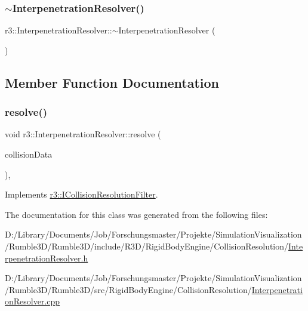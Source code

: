 \subsubsection{\texorpdfstring{$\sim$\+Interpenetration\+Resolver()}{~InterpenetrationResolver()}}
{\footnotesize\ttfamily r3\+::\+Interpenetration\+Resolver\+::$\sim$\+Interpenetration\+Resolver (\begin{DoxyParamCaption}{ }\end{DoxyParamCaption})\hspace{0.3cm}{\ttfamily [default]}}



\subsection{Member Function Documentation}
\mbox{\label{classr3_1_1_interpenetration_resolver_a7a5dfd8678e5b056ec0978e857cca0ef}} 
\subsubsection{\texorpdfstring{resolve()}{resolve()}}
{\footnotesize\ttfamily void r3\+::\+Interpenetration\+Resolver\+::resolve (\begin{DoxyParamCaption}\item[{const \mbox{\hyperlink{classr3_1_1_collision_data}{Collision\+Data}} \&}]{collision\+Data }\end{DoxyParamCaption})\hspace{0.3cm}{\ttfamily [override]}, {\ttfamily [virtual]}}



Implements \mbox{\hyperlink{classr3_1_1_i_collision_resolution_filter_a9ae35c07c585500c409459ef87e5ae15}{r3\+::\+I\+Collision\+Resolution\+Filter}}.



The documentation for this class was generated from the following files\+:\begin{DoxyCompactItemize}
\item 
D\+:/\+Library/\+Documents/\+Job/\+Forschungsmaster/\+Projekte/\+Simulation\+Visualization/\+Rumble3\+D/\+Rumble3\+D/include/\+R3\+D/\+Rigid\+Body\+Engine/\+Collision\+Resolution/\mbox{\hyperlink{_interpenetration_resolver_8h}{Interpenetration\+Resolver.\+h}}\item 
D\+:/\+Library/\+Documents/\+Job/\+Forschungsmaster/\+Projekte/\+Simulation\+Visualization/\+Rumble3\+D/\+Rumble3\+D/src/\+Rigid\+Body\+Engine/\+Collision\+Resolution/\mbox{\hyperlink{_interpenetration_resolver_8cpp}{Interpenetration\+Resolver.\+cpp}}\end{DoxyCompactItemize}
